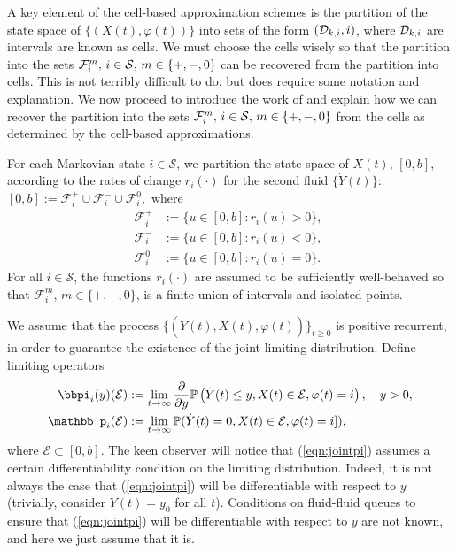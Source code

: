 A key element of the cell-based approximation schemes is the partition of the state space of \(\{(X(t),\varphi(t))\}\) into sets of the form \((\mathcal{D}_{k,i},i)\), where \(\mathcal{D}_{k,i}\) are intervals are known as cells. We must choose the cells wisely so that the partition into the sets \(\mathcal F_i^m,\, i\in\mathcal{S},\,m\in\{+,-,0\}\) can be recovered from the partition into cells. This is not terribly difficult to do, but does require some notation and explanation. We now proceed to introduce the work of \cite{bo2014} and explain how we can recover the partition into the sets \(\mathcal F_i^m,\, i\in\mathcal{S},\,m\in\{+,-,0\}\) from the cells as determined by the cell-based approximations.

For each Markovian state $i \in \mathcal{S}$, we partition the state space of \( X(t)\), \([0,b]\), according to the rates of change $r_i(\cdot)$ for the second fluid $\{\dot Y(t)\}$: $[0,b] := \mathcal{F}^{+}_i \cup \mathcal{F}^{-}_i \cup \mathcal{F}^{0}_i,$  
where 
% 
		\begin{align} 
			\mathcal{F}^{+}_i & := \{u \in [0,b] : r_i(u) > 0\},  \; \nonumber
			\\\mathcal{F}^{-}_i &:=  \{u \in [0,b]:  r_i(u) < 0\}, \; \nonumber
			\\\mathcal{F}^{0}_i &:= \{u \in [0,b]: r_i(u) = 0\}.\label{eqn:fil}
		\end{align} 
% 
For all $i \in \mathcal{S}$, the functions $r_i(\cdot)$ are assumed to be sufficiently well-behaved so that $\mathcal{F}^{m}_i$, $m \in \{+, -, 0\}$, is a finite union of intervals and isolated points. 

We assume that the process $\{(\dot Y(t), X(t), \varphi(t))\}_{t\geq 0}$ is positive recurrent, in order to guarantee the existence of the joint limiting distribution. Define limiting operators 
\begin{align} 
		\label{eqn:jointpi} 
		\bbpi_i(y)(\mathcal{E}) & := \lim_{t \rightarrow \infty} \frac{\partial}{\partial y} \mathbb{P}\left( \dot Y(t) \leq y,  X(t) \in \mathcal{E}, \varphi(t) = i\right), \quad y>0,\\
% 
		\label{eqn:jointmass}
		{\mathbb p}_i(\mathcal{E}) & := \lim_{t \rightarrow \infty}  \mathbb{P}( \dot Y(t) = 0,  X(t) \in \mathcal{E}, \varphi(t) = i]),
\end{align} 
where $\mathcal{E} \subset [0,b]$. The keen observer will notice that (\ref{eqn:jointpi}) assumes a certain differentiability condition on the limiting distribution. Indeed, it is not always the case that (\ref{eqn:jointpi}) will be differentiable with respect to \(y\) (trivially, consider \(\dot Y(t)=y_0\) for all \(t\)). Conditions on fluid-fluid queues to ensure that (\ref{eqn:jointpi}) will be differentiable with respect to \(y\) are not known, and here we just assume that it is. 

